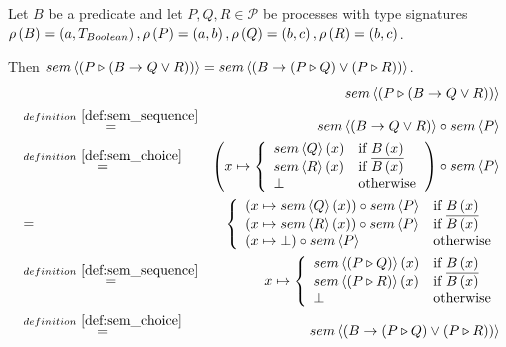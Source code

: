 \begin{myproof}
Let $B$ be a predicate and let $P, Q, R \in \mathcal{P}$ be processes with type signatures $\typesignature{B}{a}{T_{Boolean}}, \linebreak \typesignature{P}{a}{b}, \typesignature{Q}{b}{c}, \typesignature{R}{b}{c}$. 

Then $sem \left\langle \left( P \triangleright \left( B \to Q \vee R \right) \right) \right\rangle = sem \left\langle \left( B \to \left( P \triangleright Q \right) \vee \left( P \triangleright R \right) \right) \right\rangle$.
\begin{eqnarray*}
  & & \sem{\sequence{P}{\choice{B}{Q}{R}}} \\
  & \overset{\defref{def:sem_sequence}}{=} & \sem{\choice{B}{Q}{R}} \circ \sem{P} \\
  & \overset{\defref{def:sem_choice}}{=}   & \left( x \mapsto \left\{\begin{array}{ll}
                                                                       \sem{Q} \left( x \right) & \text{if } B \left( x \right) \\
                                                                       \sem{R} \left( x \right) & \text{if } \overline{B \left( x \right)} \\
                                                                       \bot & \text{otherwise}
                                                                     \end{array}
                                                              \right.\right) \circ \sem{P} \\
  & = & \left\{\begin{array}{ll}
                 \left( x \mapsto \sem{Q} \left( x \right) \right) \circ \sem{P} & \text{if } B \left( x \right) \\
                 \left( x \mapsto \sem{R} \left( x \right) \right) \circ \sem{P} & \text{if } \overline{B \left( x \right)} \\
                 \left( x \mapsto \bot \right) \circ \sem{P} & \text{otherwise}
               \end{array}
        \right. \\
  & \overset{\defref{def:sem_sequence}}{=} & x \mapsto \left\{\begin{array}{ll}
                                                                      \sem{\sequence{P}{Q}} \left( x \right) & \text{if } B \left( x \right) \\
                                                                      \sem{\sequence{P}{R}} \left( x \right) & \text{if } \overline{B \left( x \right)} \\
                                                                      \bot & \text{otherwise}
                                                          \end{array}
                                                   \right. \\
  & \overset{\defref{def:sem_choice}}{=}   & \sem{\choice{B}{\sequence{P}{Q}}{\sequence{P}{R}}}
\end{eqnarray*}


\end{myproof}
